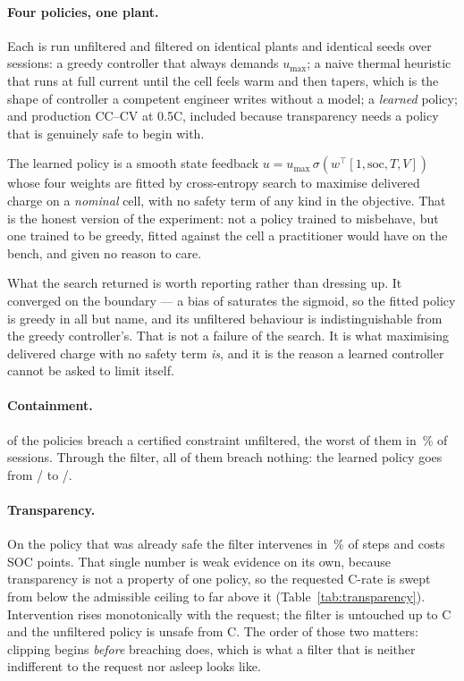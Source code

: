 \documentclass[11pt,letterpaper]{article}
\theoremstyle{definition}
\theoremstyle{remark}
\begin{document}
\paragraph{Four policies, one plant.} Each is run unfiltered and filtered on identical plants
and identical seeds over \pTrials{} sessions: a greedy controller that always demands
$u_{\max}$; a naive thermal heuristic that runs at full current until the cell feels warm and
then tapers, which is the shape of controller a competent engineer writes without a model; a
\emph{learned} policy; and production CC--CV at 0.5C, included because transparency needs a
policy that is genuinely safe to begin with.

The learned policy is a smooth state feedback $u = u_{\max}\,\sigma(w^\top[1, \mathrm{soc},
T, V])$ whose four weights are fitted by cross-entropy search to maximise delivered charge on a
\emph{nominal} cell, with no safety term of any kind in the objective. That is the honest
version of the experiment: not a policy trained to misbehave, but one trained to be greedy,
fitted against the cell a practitioner would have on the bench, and given no reason to care.

What the search returned is worth reporting rather than dressing up. It converged on the
boundary --- a bias of \pLearnBias{} saturates the sigmoid, so the fitted policy is greedy in
all but name, and its unfiltered behaviour is indistinguishable from the greedy controller's.
That is not a failure of the search. It is what maximising delivered charge with no safety term
\emph{is}, and it is the reason a learned controller cannot be asked to limit itself.

\paragraph{Containment.} \pUnsafe{} of the \pPolicies{} policies breach a certified constraint
unfiltered, the worst of them in \pWorstRate\,\% of sessions. Through the filter, all of them
breach nothing: the learned policy goes from \pLearnViol/\pTrials{} to \pLearnFilt/\pTrials.

\paragraph{Transparency.} On the policy that was already safe the filter intervenes in
\pSafeClip\,\% of steps and costs \pSafeCost{} SOC points. That single number is weak evidence
on its own, because transparency is not a property of one policy, so the requested C-rate is
swept from below the admissible ceiling to far above it (Table~\ref{tab:transparency}).
Intervention rises monotonically with the request; the filter is untouched up to \pUntouchedC C
and the unfiltered policy is unsafe from \pUnsafeC C. The order of those two matters: clipping
begins \emph{before} breaching does, which is what a filter that is neither indifferent to the
request nor asleep looks like.
\end{document}
